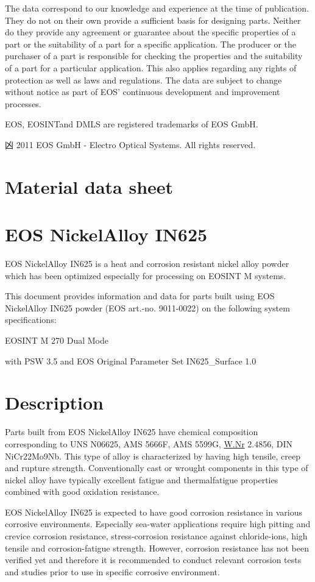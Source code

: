 \documentclass[10pt]{article}
\begin{document}
The data correspond to our knowledge and experience at the time of publication. They do not on their own provide a sufficient basis for designing parts. Neither do they provide any agreement or guarantee about the specific properties of a part or the suitability of a part for a specific application. The producer or the purchaser of a part is responsible for checking the properties and the suitability of a part for a particular application. This also applies regarding any rights of protection as well as laws and regulations. The data are subject to change without notice as part of EOS' continuous development and improvement processes.

EOS, EOSINTand DMLS are registered trademarks of EOS GmbH.

凶 2011 EOS GmbH - Electro Optical Systems. All rights reserved.

\section*{Material data sheet}
\section*{EOS NickelAlloy IN625}
EOS NickelAlloy IN625 is a heat and corrosion resistant nickel alloy powder which has been optimized especially for processing on EOSINT M systems.

This document provides information and data for parts built using EOS NickelAlloy IN625 powder (EOS art.-no. 9011-0022) on the following system specifications:

EOSINT M 270 Dual Mode

with PSW 3.5 and EOS Original Parameter Set IN625\_Surface 1.0

\section*{Description}
Parts built from EOS NickelAlloy IN625 have chemical composition corresponding to UNS N06625, AMS 5666F, AMS 5599G, \href{http://W.Nr}{W.Nr} 2.4856, DIN NiCr22Mo9Nb. This type of alloy is characterized by having high tensile, creep and rupture strength. Conventionally cast or wrought components in this type of nickel alloy have typically excellent fatigue and thermalfatigue properties combined with good oxidation resistance.

EOS NickelAlloy IN625 is expected to have good corrosion resistance in various corrosive environments. Especially sea-water applications require high pitting and crevice corrosion resistance, stress-corrosion resistance against chloride-ions, high tensile and corrosion-fatigue strength. However, corrosion resistance has not been verified yet and therefore it is recommended to conduct relevant corrosion tests and studies prior to use in specific corrosive environment.
\end{document}
